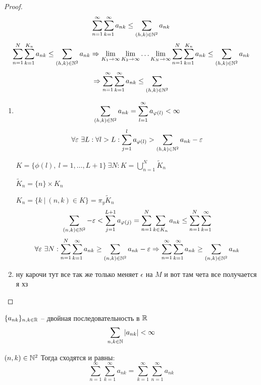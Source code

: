     \begin{proof}
        \[
            \sum_{n=1}^\infty \sum_{k=1}^\infty a_{nk} \le \sum_{(h, k) \in \mathbb{N}^2} a_{nk}    
        \]
        \[
            \sum_{n=1}^N \sum_{k=1}^{K_n} a_{nk} \le \sum_{(h, k) \in \mathbb{N}^2} a_{nk} \Rightarrow \lim_{K_1 \rightarrow \infty} 
            \lim_{K_2 \rightarrow \infty} \dots \lim_{K_N \rightarrow \infty} \sum_{n=1}^N \sum_{k=1}^{K_n} a_{nk} \le \sum_{(h, k) \in \mathbb{N}^2} a_{nk}
        \]
        \[
            \Rightarrow \sum_{n=1}^\infty \sum_{k=1}^\infty a_{nk} \le \sum_{(h, k) \in \mathbb{N}^2}    
        \]

        \begin{enumerate}
            \item \[
                \sum_{(h, k) \in \mathbb{N}^2} a_{nk} = \sum_{l = 1}^\infty a_{\varphi(l)} < \infty    
            \]
            \[
                \forall \varepsilon \ \exists L : \forall l > L : \sum_{j=1}^l a_{\varphi(l)} > \sum_{(h, k) \in \mathbb{N}^2} a_{nk}  - \varepsilon   
            \]
            \par $K = \{\phi(l), \ l = 1, \dots, L + 1\} \ \exists N : K = \bigcup_{n=1}^N \tilde K_n$
            \par $\tilde K_n = \{n\} \times K_n$
            \par $K_n = \{k \ | \ (n, k) \in K\} = \pi_y \tilde K_n$
            \[
                \sum_{(n, k) \in \mathbb{N}^2} - \varepsilon< \sum_{j=1}^{L+1} a_{\varphi(j)} = \sum_{n=1}^N \sum_{k \in K_n} a_{nk} \le \sum_{n=1}^N \sum_{k=1}^\infty    
            \]
            \[
                \forall \varepsilon \ \exists N : \sum_{n=1}^N \sum_{k=1}^\infty a_{nk} \ge \sum_{(n, k) \in \mathbb{N}^2} a_{nk} - \varepsilon \Rightarrow \sum_{n=1}^\infty \sum_{k=1}^\infty a_{nk} \ge \sum_{(n, k) \in \mathbb{N}^2} a_{nk}
            \]
            \item ну карочи тут все так же только меняет  $\epsilon$ на $M$ и вот там чета все получается я хз  
        \end{enumerate}
    \end{proof}

    \begin{theorem}
        $\{a_{nk}\}_{n, k \in \mathbb{R}}$ -- двойная последовательность в $\mathbb{R}$
        \[
            \sum_{n, k \in \mathbb{N}} |a_{nk}| < \infty    
        \]
        \par $(n, k) \in \mathbb{N}^2$ \quad Тогда сходятся и равны:
        \[
            \sum_{n=1}^\infty \sum_{k=1}^\infty a_{nk} = \sum_{k=1}^\infty \sum_{n=1}^\infty a_{nk}    
        \]
    \end{theorem}
    

